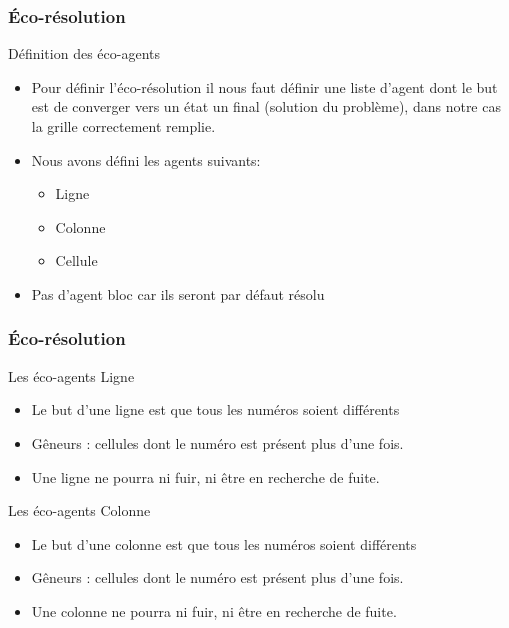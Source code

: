 \begin{frame}
    \frametitle{Éco-résolution}
    \begin{block}{Définition des éco-agents}
    		\begin{itemize}
    		
    		\item Pour définir l'éco-résolution il nous faut définir une liste d'agent dont le but est de converger vers un état un final (solution du problème), dans notre cas la grille correctement remplie.\\
    		\item Nous avons défini les agents suivants:
    		\begin{itemize}
    			\item Ligne
    			\item Colonne
    			\item Cellule
    		\end{itemize}
    		\item Pas d'agent bloc car ils seront par défaut résolu
    		\end{itemize}

    \end{block}
\end{frame}

\begin{frame}
    \frametitle{Éco-résolution}
    \begin{block}{Les éco-agents Ligne}
    		\begin{itemize}
    			\item Le but d'une ligne est que tous les numéros soient différents
    			\item Gêneurs : cellules dont le numéro est présent plus d'une fois.
    			\item Une ligne ne pourra ni fuir, ni être en recherche de fuite. 
    		\end{itemize}
    \end{block}
    \pause
     \begin{block}{Les éco-agents Colonne}
    		\begin{itemize}
    			\item Le but d'une colonne est que tous les numéros soient différents
    			\item Gêneurs : cellules dont le numéro est présent plus d'une fois.
    			\item Une colonne ne pourra ni fuir, ni être en recherche de fuite. 
    		\end{itemize}
    \end{block}
\end{frame}


